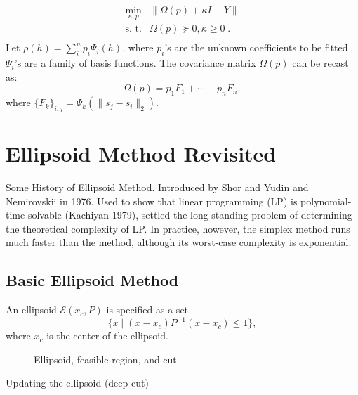 \documentclass[final,leqno]{siamltex}
\begin{document}
\[\begin{array}{ll}
   \min_{\kappa, p}   & \| \Omega(p) + \kappa I - Y \| \\
   \text{s. t.} & \Omega(p) \succcurlyeq 0,  \kappa \geq 0 \; .\\
  \end{array}
\]
Let \(\rho(h) = \sum_i^n p_i \Psi_i(h)\), where \(p_i\)'s are the unknown coefficients to be fitted \(\Psi_i\)'s are a family of basis functions. The covariance matrix \(\Omega(p)\) can be recast as:
\[\Omega(p) = p_1 F_1 + \cdots + p_n F_n, \]
where \(\{F_k\}_{i,j} =\Psi_k( \| s_j - s_i \|_2)\).

\hypertarget{sec:ellipsoid-method-revisited}{%
\section{Ellipsoid Method Revisited}\label{sec:ellipsoid-method-revisited}}

Some History of Ellipsoid Method. Introduced by Shor and Yudin and Nemirovskii in 1976. Used to show that linear programming (LP) is polynomial-time solvable (Kachiyan 1979), settled the long-standing problem of determining the theoretical complexity of LP. In practice, however, the simplex method runs much faster than the method, although its worst-case complexity is exponential.

\hypertarget{sec:basic-ellipsoid-method}{%
\subsection{Basic Ellipsoid Method}\label{sec:basic-ellipsoid-method}}

An ellipsoid \(\mathcal{E}(x_c, P)\) is specified as a set
\[\{x \mid (x-x_c)P^{-1}(x-x_c) \leq 1 \}, \]
where \(x_c\) is the center of the ellipsoid.

\begin{figure}
\caption{Ellipsoid, feasible region, and cut}
\label{fig:ellipsoid}
\end{figure}

Updating the ellipsoid (deep-cut)
\end{document}
